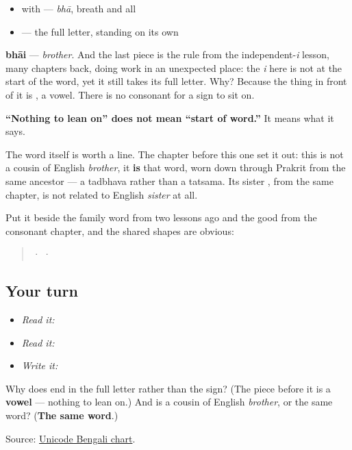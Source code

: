 \begin{itemize}
\raggedright
  \item \textbf{} with \textbf{} — \emph{bhā}, breath and all
  \item \textbf{} — the full letter, standing on its own
\end{itemize}

\textbf{bhāi} — \emph{brother}. And the last piece is the rule from the independent-\emph{i} lesson, many chapters back, doing work in an unexpected place: the \emph{i} here is not at the start of the word, yet it still takes its full letter. Why? Because the thing in front of it is \textbf{}, a vowel. There is no consonant for a sign to sit on.

\textbf{\textquotedblleft{}Nothing to lean on\textquotedblright{} does not mean \textquotedblleft{}start of word.\textquotedblright{}} It means what it says.

The word itself is worth a line. The chapter before this one set it out: this is not a cousin of English \emph{brother}, it \textbf{is} that word, worn down through Prakrit from the same ancestor — a tadbhava rather than a tatsama. Its sister \textbf{}, from the same chapter, is not related to English \emph{sister} at all.

Put it beside the family word from two lessons ago and the good from the consonant chapter, and the shared shapes are obvious:

\begin{quote}
\textbf{} · \textbf{} · \textbf{}
\end{quote}

\subsection*{Your turn}
\begin{itemize}
\raggedright
  \item \emph{Read it:} 
  \item \emph{Read it:}   
  \item \emph{Write it:} 
\end{itemize}

\begin{tcolorbox}[breakable,colback=teal!4,colframe=teal!35!black,title={Before you move on}]
Why does \textbf{} end in the full letter \textbf{} rather than the sign? (The piece before it is a \textbf{vowel} — nothing to lean on.) And is \textbf{} a cousin of English \emph{brother}, or the same word? (\textbf{The same word}.)

Source: \href{https://www.unicode.org/charts/PDF/U0980.pdf}{Unicode Bengali chart}.
\end{tcolorbox}

